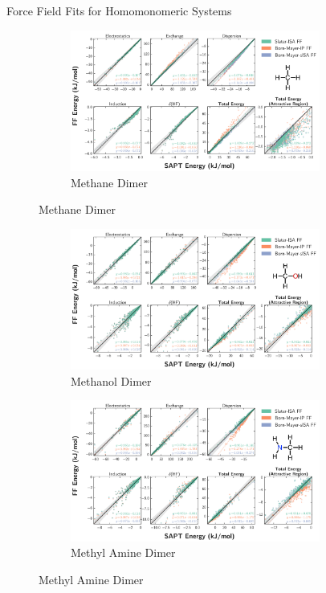 \begin{section}{Force Field Fits for Homomonomeric Systems}
\begin{figure}
\begin{subfigure}{\textwidth}
    \end{subfigure}
    \begin{subfigure}{\textwidth}
        \caption{Methane Dimer}
        \includegraphics[width=0.9\textwidth]{isotropic/si/methane_methane_scatter.pdf}
    \end{subfigure}
    \end{figure}
    \begin{figure}
    \ContinuedFloat
    \begin{subfigure}{\textwidth}
        \caption{Methanol Dimer}
        \includegraphics[width=0.9\textwidth]{isotropic/si/methanol_methanol_scatter.pdf}
    \end{subfigure}
    \begin{subfigure}{\textwidth}
        \caption{Methyl Amine Dimer}
        \includegraphics[width=0.9\textwidth]{isotropic/si/methyl_amine_methyl_amine_scatter.pdf}

\end{subfigure}
\end{figure}
\end{section}
